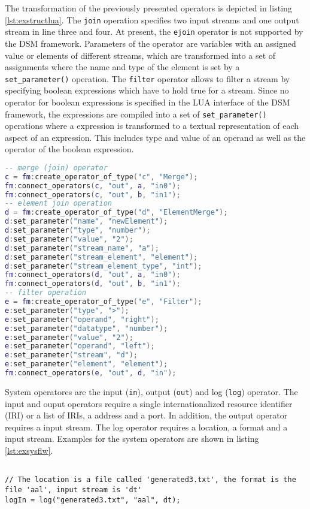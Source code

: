 The transformation of the previously presented operators is depicted in listing
\ref{lst:exstructlua}. The \texttt{join} operation specifies two input streams
and one output stream in line three and four. At present, the \texttt{ejoin} 
operator is not supported by the DSM framework. Parameters of the operator are
variables with an assigned value or elements of different streams, which are 
transformed into a set of assignments where the name and type of the element
is set by a \texttt{set\_parameter()} operation. The \texttt{filter} operator
allows to filter a stream by specifying boolean expressions which have to hold
true for a stream. Since no operator for boolean expressions is specified in the
LUA interface of the DSM framework, the expressions are compiled into a set of 
\texttt{set\_parameter()} operations where a expression is transformed to a 
textual representation of each aspect of an expression. This includes type and 
value of an operand as well as the operator of the boolean expression. 
\begin{lstlisting}[language=Lua, caption={\emph{Generated LUA code of Structural Operators}},label={lst:exstructlua}]
-- merge (join) operator
c = fm:create_operator_of_type("c", "Merge");
fm:connect_operators(c, "out", a, "in0");
fm:connect_operators(c, "out", b, "in1");
-- element join operation 
d = fm:create_operator_of_type("d", "ElementMerge");
d:set_parameter("name", "newElement");
d:set_parameter("type", "number");
d:set_parameter("value", "2");
d:set_parameter("stream_name", "a");
d:set_parameter("stream_element", "element");
d:set_parameter("stream_element_type", "int");
fm:connect_operators(d, "out", a, "in0");
fm:connect_operators(d, "out", b, "in1");
-- filter operation 
e = fm:create_operator_of_type("e", "Filter");
e:set_parameter("type", ">");
e:set_parameter("operand", "right");
e:set_parameter("datatype", "number");
e:set_parameter("value", "2");
e:set_parameter("operand", "left");
e:set_parameter("stream", "d");
e:set_parameter("element", "element");
fm:connect_operators(e, "out", d, "in");
\end{lstlisting}
System operatores are the input (\texttt{in}), output (\texttt{out}) and log
(\texttt{log}) operator. The input and ouput operators require a single 
internationalized resource identifier (IRI) or a list of IRIs, a address and a 
port. In addition, the output operator requires a input stream. The log operator
requires a location, a format and a input stream. Examples for the system 
operators are shown in listing \ref{lst:exsysflw}.
\begin{lstlisting}[language=Flow, caption={\emph{Examples of System Operators}},label={lst:exsysflw}]

// The location is a file called 'generated3.txt', the format is the file 'aal', input stream is 'dt'
logIn = log("generated3.txt", "aal", dt);
\end{lstlisting}

